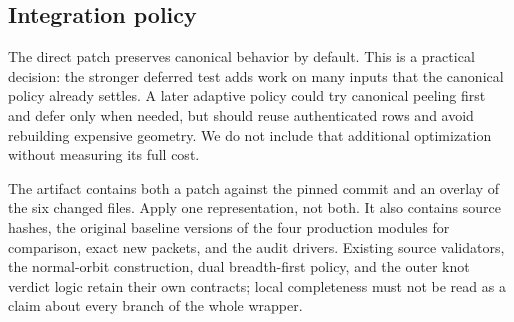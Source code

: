 \subsection{Integration policy}

The direct patch preserves canonical behavior by default.  This is a
practical decision: the stronger deferred test adds work on many inputs
that the canonical policy already settles.  A later adaptive policy could
try canonical peeling first and defer only when needed, but should reuse
authenticated rows and avoid rebuilding expensive geometry.  We do not
include that additional optimization without measuring its full cost.

The artifact contains both a patch against the pinned commit and an
overlay of the six changed files.  Apply one representation, not both.
It also contains source hashes, the original baseline versions of the
four production modules for comparison, exact new packets, and the audit
drivers.  Existing source validators, the normal-orbit construction,
dual breadth-first policy, and the outer knot verdict logic retain their
own contracts; local completeness must not be read as a claim about
every branch of the whole wrapper.

